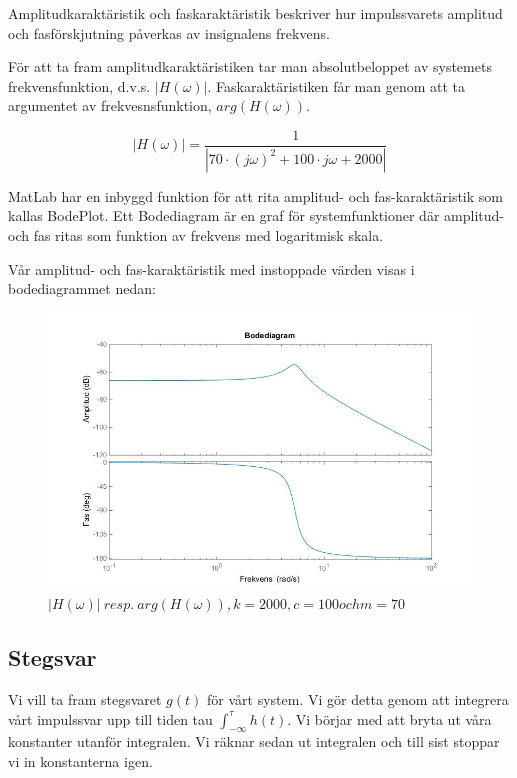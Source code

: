 \documentclass[10pt,a4paper]{article}
\begin{document}
Amplitudkaraktäristik och faskaraktäristik beskriver hur impulssvarets amplitud och fasförskjutning påverkas av insignalens frekvens.

För att ta fram amplitudkaraktäristiken tar man absolutbeloppet av systemets frekvensfunktion, d.v.s. $|H(\omega)|$. Faskaraktäristiken får man genom att ta argumentet av frekvesnsfunktion, $arg(H(\omega))$. 

\begin{equation}
|H(\omega)| = \frac{1}{|70\cdot (j\omega)^2 + 100 \cdot j\omega + 2000|}
\end{equation}

MatLab har en inbyggd funktion för att rita amplitud- och fas-karaktäristik som kallas BodePlot. Ett Bodediagram är en graf för systemfunktioner där amplitud- och fas ritas som funktion av frekvens med logaritmisk skala.

Vår amplitud- och fas-karaktäristik med instoppade värden visas i bodediagrammet nedan:


\begin{figure}[h]
\begin{center}
\includegraphics[scale=0.5]{BodePlot(FasAmpKar)}
\caption{$|H(\omega)| \ resp. \ arg(H(\omega)), k = 2000, c = 100 och m = 70$ }
\end{center}
\end{figure}

\newpage

\subsection{Stegsvar}

Vi vill ta fram stegsvaret $g(t)$ för vårt system. Vi gör detta genom att integrera vårt impulssvar upp till tiden tau $\int_{-\infty}^\tau h(t)$. Vi börjar med att bryta ut våra konstanter utanför integralen. Vi räknar sedan ut integralen och till sist stoppar vi in konstanterna igen.
\end{document}

